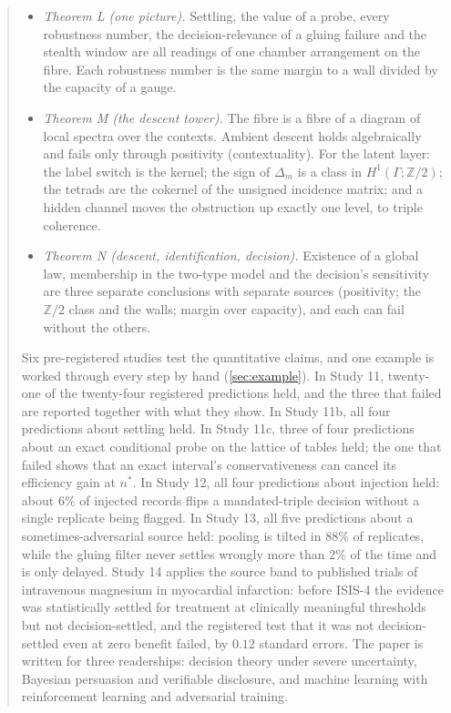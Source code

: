 \documentclass[11pt]{article}
\theoremstyle{definition}\newtheorem{definition}{Definition}\newtheorem{remark}{Remark}
\begin{document}
\begin{abstract}
\begin{itemize}
  propositions on dilation, on the value of a probe in its size (a Radner--Stiglitz flat start, and a negative Wald value for a fixed rule), on
  backtracking, and on rectangularity as gluing.
\item \emph{Theorem L (one picture).} Settling, the value of a probe, every robustness number, the decision-relevance of a gluing
  failure and the stealth window are all readings of one chamber arrangement on the fibre. Each robustness number is the same margin to
  a wall divided by the capacity of a gauge.
\item \emph{Theorem M (the descent tower).} The fibre is a fibre of a diagram of local spectra over the contexts. Ambient descent holds
  algebraically and fails only through positivity (contextuality). For the latent layer: the label switch is the kernel; the sign of
  $\Delta_m$ is a class in $H^1(\Gamma;\mathbb Z/2)$; the tetrads are the cokernel of the unsigned incidence matrix; and a hidden channel
  moves the obstruction up exactly one level, to triple coherence.
\item \emph{Theorem N (descent, identification, decision).} Existence of a global law, membership in the two-type model and the
  decision's sensitivity are three separate conclusions with separate sources (positivity; the $\mathbb Z/2$ class and the walls; margin over
  capacity), and each can fail without the others.
\end{itemize}
Six pre-registered studies test the quantitative claims, and one example is worked through every step by hand
(\cref{sec:example}). In Study 11, twenty-one of the twenty-four registered predictions held, and the
three that failed are reported together with what they show. In Study 11b, all four predictions about settling held. In Study 11c, three of four predictions about an exact conditional probe on the lattice of tables held; the one that failed shows that an exact interval's conservativeness can cancel its efficiency gain at $n^*$. In Study 12, all four predictions about injection held: about $6\%$ of injected
records flips a mandated-triple decision without a single replicate being flagged. In Study 13, all five predictions about a
sometimes-adversarial source held: pooling is tilted in $88\%$ of replicates, while the gluing filter never settles wrongly more than
$2\%$ of the time and is only delayed. Study 14 applies the source band to published trials of intravenous magnesium in
myocardial infarction: before ISIS-4 the evidence was statistically settled for treatment at clinically meaningful thresholds but not
decision-settled, and the registered test that it was not decision-settled even at zero benefit failed, by $0.12$ standard errors. The paper is written for three readerships: decision theory under severe
uncertainty, Bayesian persuasion and verifiable disclosure, and machine learning with reinforcement learning and adversarial training.
\end{abstract}
\end{document}
